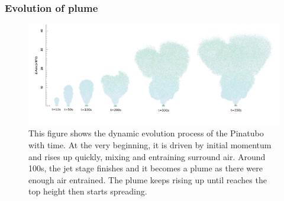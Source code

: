 \documentclass[journal abbreviation, manuscript]{copernicus}
\begin{document}
\subsubsection{Evolution of plume} 

\begin{figure}
\center
\includegraphics[width=15cm]{strong_elevation}
\caption{This figure shows the dynamic evolution process of the Pinatubo with time. At the very beginning, it is driven by initial momentum and rises up quickly, mixing and entraining surround air. Around 100s, the jet stage finishes and it becomes a plume as there were enough air entrained. The plume keeps rising up until reaches the top height then starts spreading.}
\label{fig:strong_evolution}
\end{figure}
\end{document}
